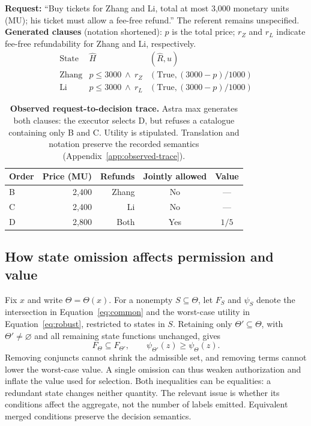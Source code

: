 \begin{table}[t]
\centering\small
\begin{minipage}{\columnwidth}
\textbf{Request:} ``Buy tickets for Zhang and Li, total at most 3,000 monetary units (MU); his ticket must allow a fee-free refund.'' The referent remains unspecified.\\[3pt]
\textbf{Generated clauses} (notation shortened): $p$ is the total price; $r_Z$ and $r_L$ indicate fee-free refundability for Zhang and Li, respectively.
\[
\begin{array}{l|ll}
\text{State} & \widehat H & (\widehat R,\widehat u)\\
\hline
\text{Zhang} & p\le3000\ \wedge\ r_Z &(\mathrm{True},(3000-p)/1000)\\
\text{Li} & p\le3000\ \wedge\ r_L &(\mathrm{True},(3000-p)/1000)
\end{array}
\]
\end{minipage}
\begin{tabular}{@{}lrrcc@{}}
\toprule
Order & Price (MU) & Refunds & Jointly allowed & Value\\
\midrule
B & 2,400 & Zhang & No & ---\\
C & 2,400 & Li & No & ---\\
D & 2,800 & Both & Yes & $1/5$\\
\bottomrule
\end{tabular}
\caption{\textbf{Observed request-to-decision trace.} Astra max generates both clauses: the executor selects D, but refuses a catalogue containing only B and C. Utility is stipulated. Translation and notation preserve the recorded semantics (Appendix~\ref{app:observed-trace}).}
\label{tab:observed-trace}
\end{table}

\subsection{How state omission affects permission and value}
\label{app:omission-analysis}
Fix $x$ and write $\Theta=\Theta(x)$. For a nonempty $S\subseteq\Theta$, let $F_S$ and $\psi_S$ denote the intersection in Equation~\eqref{eq:common} and the worst-case utility in Equation~\eqref{eq:robust}, restricted to states in $S$. Retaining only $\Theta'\subseteq\Theta$, with $\Theta'\ne\varnothing$ and all remaining state functions unchanged, gives
\begin{equation}
F_\Theta\subseteq F_{\Theta'},\qquad
\psi_{\Theta'}(z)\ge\psi_\Theta(z).
\label{eq:omission}
\end{equation}
Removing conjuncts cannot shrink the admissible set, and removing terms cannot lower the worst-case value. A single omission can thus weaken authorization and inflate the value used for selection. Both inequalities can be equalities: a redundant state changes neither quantity. The relevant issue is whether its conditions affect the aggregate, not the number of labels emitted. Equivalent merged conditions preserve the decision semantics.

